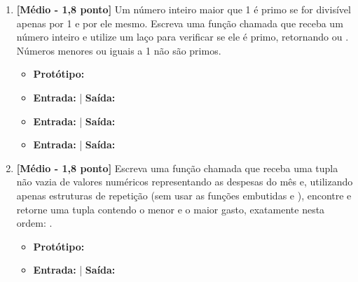 \begin{enumerate}[label=\textbf{Q\arabic*.}, start=25]


\vspace{0.4cm}

\item \textbf{[Médio - 1,8 ponto]} Um número inteiro maior que 1 é primo se for divisível apenas por 1 e por ele mesmo. Escreva uma função chamada  que receba um número inteiro e utilize um laço  para verificar se ele é primo, retornando  ou . Números menores ou iguais a 1 não são primos.

\begin{itemize}[leftmargin=*]
    \item \textbf{Protótipo:}\newline {}
    \item \textbf{Entrada:}  | \textbf{Saída:} 
    \item \textbf{Entrada:}  | \textbf{Saída:} 
    \item \textbf{Entrada:}  | \textbf{Saída:} 
\end{itemize}



\vspace{0.4cm}

\item \textbf{[Médio - 1,8 ponto]} Escreva uma função chamada  que receba uma tupla não vazia de valores numéricos representando as despesas do mês e, utilizando apenas estruturas de repetição (sem usar as funções embutidas  e ), encontre e retorne uma tupla contendo o menor e o maior gasto, exatamente nesta ordem: .

\begin{itemize}[leftmargin=*]
    \item \textbf{Protótipo:}\newline {}\\
    \item \textbf{Entrada:}  | \textbf{Saída:} 
\end{itemize}



\vspace{0.4cm}


\end{enumerate}
